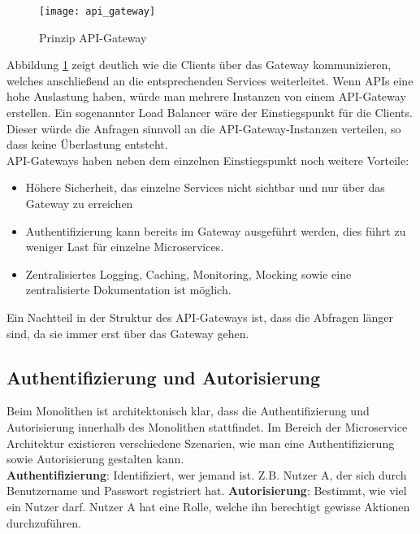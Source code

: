 \begin{figure}[ht]
	\centering
	\texttt{[image: api\_gateway]}
	\caption[Prinzip API-Gateway] { Prinzip API-Gateway }
	\label{fig:api_gateway}
\end{figure}

Abbildung \ref{fig:api_gateway} zeigt deutlich wie die Clients über das Gateway kommunizieren, welches anschließend an die entsprechenden Services weiterleitet. Wenn APIs eine hohe Auslastung haben, würde man mehrere Instanzen von einem API-Gateway erstellen. Ein sogenannter Load Balancer wäre der Einstiegspunkt für die Clients. Dieser würde die Anfragen sinnvoll an die API-Gateway-Instanzen verteilen, so dass keine Überlastung entsteht.\cite{oracle} \\

API-Gateways haben neben dem einzelnen Einstiegspunkt noch weitere Vorteile: 
	\begin{itemize}
	\item Höhere Sicherheit, das einzelne Services nicht sichtbar und nur über das Gateway zu erreichen\cite{bruce2019mic_in_action}
	\item Authentifizierung kann bereits im Gateway ausgeführt werden, dies führt zu weniger Last für einzelne Microservices.\cite{wolff2018mic_praxis}
	\item Zentralisiertes Logging, Caching, Monitoring, Mocking sowie eine zentralisierte Dokumentation ist möglich.\cite{wolff2018mic_praxis}
\end{itemize}  

Ein Nachtteil in der Struktur des API-Gateways ist, dass die Abfragen länger sind, da sie immer erst über das Gateway gehen.\\

\subsection{Authentifizierung und Autorisierung}

Beim Monolithen ist architektonisch klar, dass die Authentifizierung und Autorisierung innerhalb des Monolithen stattfindet. Im Bereich der Microservice Architektur existieren verschiedene Szenarien, wie man eine Authentifizierung sowie Autorisierung gestalten kann.\cite{bruce2019mic_in_action} \\

\textbf{Authentifizierung}: Identifiziert, wer jemand ist. Z.B. Nutzer A, der sich durch Benutzername und Passwort registriert hat.\cite{bruce2019mic_in_action}
\textbf{Autorisierung}: Bestimmt, wie viel ein Nutzer darf. Nutzer A hat eine Rolle, welche ihn berechtigt gewisse Aktionen durchzuführen.\cite{bruce2019mic_in_action}

